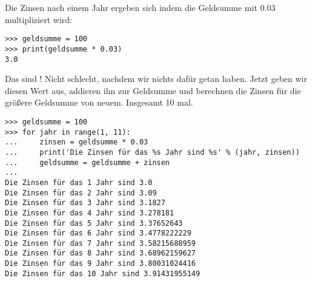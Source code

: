 Die Zinsen nach einem Jahr ergeben sich indem die Geldsumme mit 0.03 multipliziert wird:

\begin{listing}
\begin{verbatim}
>>> geldsumme = 100
>>> print(geldsumme * 0.03)
3.0
\end{verbatim}
\end{listing}

Das sind ! Nicht schlecht, nachdem wir nichts dafür getan haben. Jetzt geben wir diesen Wert aus, addieren ihn zur Geldsumme und berechnen die Zinsen für die größere Geldsumme von neuem. Insgesamt 10 mal.

\begin{listing}
\begin{verbatim}
>>> geldsumme = 100
>>> for jahr in range(1, 11):
...     zinsen = geldsumme * 0.03
...     print('Die Zinsen für das %s Jahr sind %s' % (jahr, zinsen))
...     geldsumme = geldsumme + zinsen
... 
Die Zinsen für das 1 Jahr sind 3.0
Die Zinsen für das 2 Jahr sind 3.09
Die Zinsen für das 3 Jahr sind 3.1827
Die Zinsen für das 4 Jahr sind 3.278181
Die Zinsen für das 5 Jahr sind 3.37652643
Die Zinsen für das 6 Jahr sind 3.4778222229
Die Zinsen für das 7 Jahr sind 3.58215688959
Die Zinsen für das 8 Jahr sind 3.68962159627
Die Zinsen für das 9 Jahr sind 3.80031024416
Die Zinsen für das 10 Jahr sind 3.91431955149
\end{verbatim}
\end{listing}

